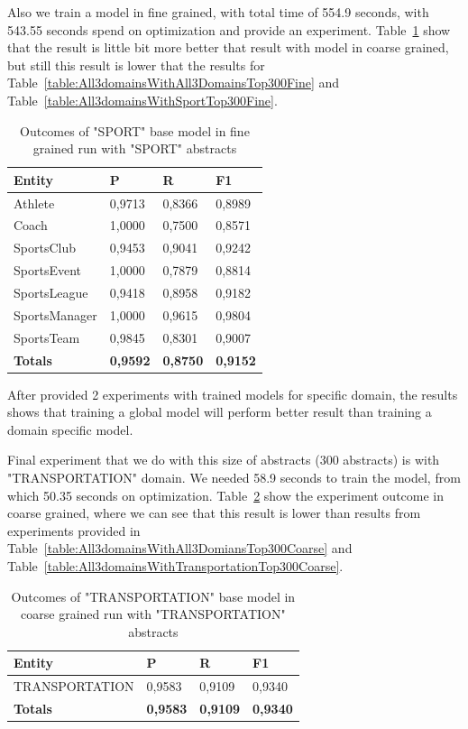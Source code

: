 \documentclass[thesis=M,english]{FITthesis}[2018/05/30]
\begin{document}
Also we train a model in fine grained, with total time of 554.9 seconds, with 543.55 seconds spend on optimization and provide an experiment. Table~\ref{table:SportdomainsWithSportTop300Fine} show that the result is little bit more better that result with model in coarse grained, but still this result is lower that the results for Table~\ref{table:All3domainsWithAll3DomainsTop300Fine} and Table~\ref{table:All3domainsWithSportTop300Fine}.
	\begin{table}[H]\centering
		\begin{tabular}{|l|l|l|l|}
			\hline {\textbf{Entity}} & {\textbf{P}} & {\textbf{R}} & {\textbf{F1}}\\\hline
				Athlete & 0,9713 & 0,8366 & 0,8989\\
				Coach & 1,0000 & 0,7500 & 0,8571\\
				SportsClub & 0,9453 & 0,9041 & 0,9242\\
				SportsEvent & 1,0000 & 0,7879 & 0,8814\\
				SportsLeague & 0,9418 & 0,8958 & 0,9182\\
				SportsManager & 1,0000 & 0,9615 & 0,9804\\				
				SportsTeam & 0,9845 & 0,8301 & 0,9007\\\hline
				\textbf{Totals} & \textbf{0,9592} & \textbf{0,8750} & \textbf{0,9152}\\\hline
		\end{tabular}
		\caption{Outcomes of "SPORT" base model in fine grained run with "SPORT" abstracts \label{table:SportdomainsWithSportTop300Fine}}
	\end{table}
	
	After provided 2 experiments with trained models for specific domain, the results shows that training a global model will perform better result than training a domain specific model.	

Final experiment that we do with this size of abstracts (300 abstracts) is with "TRANSPORTATION" domain. We needed 58.9 seconds to train the model, from which 50.35 seconds on optimization.
  Table~\ref{table:TransportationDomainsWithTransportationTop300Coarse} show the experiment outcome in coarse grained, where we can see that this result is lower than results from experiments provided in Table~\ref{table:All3domainsWithAll3DomiansTop300Coarse} and Table~\ref{table:All3domainsWithTransportationTop300Coarse}.  
	\begin{table}[H]\centering
		\begin{tabular}{|l|l|l|l|}
			\hline {\textbf{Entity}} & {\textbf{P}} & {\textbf{R}} & {\textbf{F1}}\\\hline
				TRANSPORTATION & 0,9583 & 0,9109 & 0,9340\\\hline
				\textbf{Totals} & \textbf{0,9583} & \textbf{0,9109} & \textbf{0,9340}\\\hline
		\end{tabular}
		\caption{Outcomes of "TRANSPORTATION" base model in coarse grained run with "TRANSPORTATION" abstracts \label{table:TransportationDomainsWithTransportationTop300Coarse}}
	\end{table}
	
\end{document}
